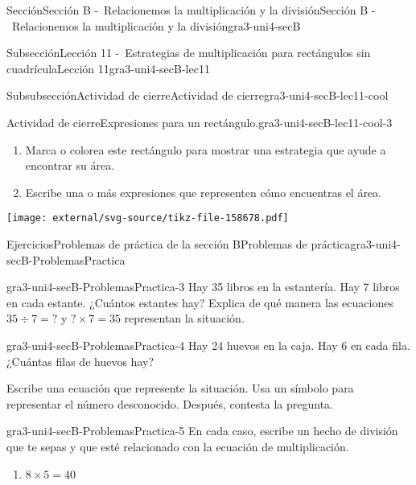 \documentclass[twoside,10pt,]{article}
\begin{document}
\begin{sectionptx}{Sección}{Sección B -~Relacionemos la multiplicación y la división}{}{Sección B -~Relacionemos la multiplicación y la división}{}{}{gra3-uni4-secB}
\begin{subsectionptx}{Subsección}{Lección 11 -~Estrategias de multiplicación para rectángulos sin cuadrícula}{}{Lección 11}{}{}{gra3-uni4-secB-lec11}
\begin{subsubsectionptx}{Subsubsección}{Actividad de cierre}{}{Actividad de cierre}{}{}{gra3-uni4-secB-lec11-cool}
\begin{project}{Actividad de cierre}{Expresiones para un rectángulo.}{gra3-uni4-secB-lec11-cool-3}%
\begin{sidebyside}{2}{0}{0}{0}%
\begin{sbspanel}{0.6}%
%
\begin{enumerate}
\item{}Marca o colorea este rectángulo para mostrar una estrategia que ayude a encontrar su área.%
\item{}Escribe una o más expresiones que representen cómo encuentras el área.%
\end{enumerate}
\end{sbspanel}%
\begin{sbspanel}{0.4}%
\texttt{[image: external/svg-source/tikz-file-158678.pdf]}
\end{sbspanel}%
\end{sidebyside}%
\end{project}%
\end{subsubsectionptx}
\end{subsectionptx}
%
%
\typeout{************************************************}
\typeout{************************************************}
%
\begin{exercises-subsection}{Ejercicios}{Problemas de práctica de la sección B}{}{Problemas de práctica}{}{}{gra3-uni4-secB-ProblemasPractica}
\begin{divisionexercise}{1}{}{}{gra3-uni4-secB-ProblemasPractica-3}%
Hay 35 libros en la estantería. Hay 7 libros en cada estante. ¿Cuántos estantes hay? Explica de qué manera las ecuaciones \(35 ÷ 7 = {?}\) y \({?} × 7 = 35\) representan la situación.%
\end{divisionexercise}%
\begin{divisionexercise}{2}{}{}{gra3-uni4-secB-ProblemasPractica-4}%
Hay 24 huevos en la caja. Hay 6 en cada fila. ¿Cuántas filas de huevos hay?%
\par
Escribe una ecuación que represente la situación. Usa un símbolo para representar el número desconocido. Después, contesta la pregunta.%
\end{divisionexercise}%
\begin{divisionexercise}{3}{}{}{gra3-uni4-secB-ProblemasPractica-5}%
En cada caso, escribe un hecho de división que te sepas y que esté relacionado con la ecuación de multiplicación.%
%
\begin{enumerate}[label=(\alph*)]
\item{}\(\displaystyle 8 \times 5 = 40\)%

\end{enumerate}
\end{divisionexercise}
\end{exercises-subsection}
\end{sectionptx}
\end{document}
